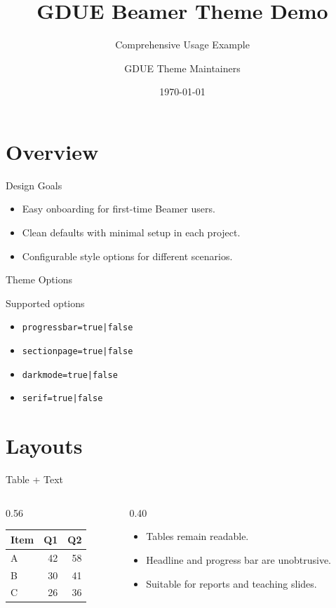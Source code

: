 \documentclass[10pt,aspectratio=169]{beamer}
\title{GDUE Beamer Theme Demo}
\subtitle{Comprehensive Usage Example}
\author{GDUE Theme Maintainers}
\institute{Guangdong University of Education}
\date{\today}
\begin{document}
\maketitle

\section{Overview}

\begin{frame}{Design Goals}
\begin{itemize}
  \item Easy onboarding for first-time Beamer users.
  \item Clean defaults with minimal setup in each project.
  \item Configurable style options for different scenarios.
\end{itemize}
\end{frame}

\begin{frame}{Theme Options}
\begin{block}{Supported options}
\begin{itemize}
  \item \texttt{progressbar=true|false}
  \item \texttt{sectionpage=true|false}
  \item \texttt{darkmode=true|false}
  \item \texttt{serif=true|false}
\end{itemize}
\end{block}
\end{frame}

\section{Layouts}

\begin{frame}{Table + Text}
\begin{columns}[T]
  \begin{column}{0.56\textwidth}
    \begin{table}
      \centering
      \begin{tabular}{lrr}
        \hline
        Item & Q1 & Q2 \\
        \hline
        A & 42 & 58 \\
        B & 30 & 41 \\
        C & 26 & 36 \\
        \hline
      \end{tabular}
    \end{table}
  \end{column}
  \begin{column}{0.40\textwidth}
    \begin{itemize}
      \item Tables remain readable.
      \item Headline and progress bar are unobtrusive.
      \item Suitable for reports and teaching slides.
    \end{itemize}
  \end{column}
\end{columns}
\end{frame}
\end{document}
